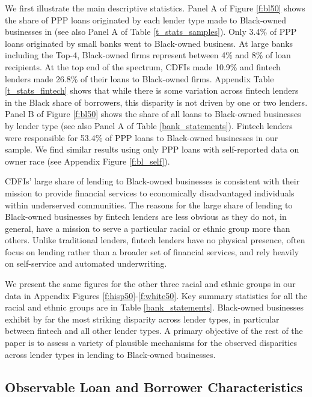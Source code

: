 \documentclass[11pt]{article}
\begin{document}
We first illustrate the main descriptive statistics. Panel A of Figure \ref{f:bl50} shows the share of PPP loans originated by each lender type made to Black-owned businesses in (see also Panel A of Table \ref{t_stats_samples}). Only 3.4\% of PPP loans originated by small banks went to Black-owned business. At large banks including the Top-4, Black-owned firms represent between 4\% and 8\% of loan recipients. At the top end of the spectrum, CDFIs made 10.9\% and fintech lenders made 26.8\% of their loans to Black-owned firms. Appendix Table \ref{t_stats_fintech} shows that while there is some variation across fintech lenders in the Black share of borrowers, this disparity is not driven by one or two lenders. Panel B of Figure \ref{f:bl50} shows the share of all loans to Black-owned businesses by lender type (see also Panel A of Table \ref{bank_statements}). Fintech lenders were responsible for 53.4\% of PPP loans to Black-owned businesses in our sample. We find similar results using only PPP loans with self-reported data on owner race (see Appendix Figure \ref{f:bl_self}).

CDFIs' large share of lending to Black-owned businesses is consistent with their mission to provide financial services to economically disadvantaged individuals within underserved communities. The reasons for the large share of lending to Black-owned businesses by fintech lenders are less obvious as they do not, in general, have a mission to serve a particular racial or ethnic group more than others. Unlike traditional lenders, fintech lenders have no physical presence, often focus on lending rather than a broader set of financial services, and rely heavily on self-service and automated underwriting. 

We present the same figures for the other three racial and ethnic groups in our data in Appendix Figures \ref{f:hisp50}-\ref{f:white50}. Key summary statistics for all the racial and ethnic groups are in Table \ref{bank_statements}. Black-owned businesses exhibit by far the most striking disparity across lender types, in particular between fintech and all other lender types. A primary objective of the rest of the paper is to assess a variety of plausible mechanisms for the observed disparities across lender types in lending to Black-owned businesses.

\subsection{Observable Loan and Borrower Characteristics}
\end{document}
